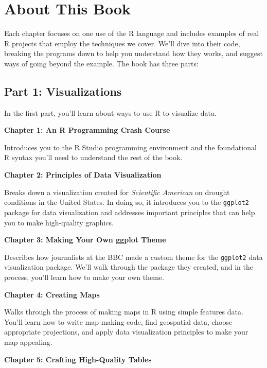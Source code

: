 \documentclass[
]{book}
\begin{document}
\hypertarget{about-this-book}{%
\section*{About This Book}\label{about-this-book}}

Each chapter focuses on one use of the R language and includes examples of real R projects that employ the techniques we cover. We'll dive into their code, breaking the programs down to help you understand how they works, and suggest ways of going beyond the example. The book has three parts:

\hypertarget{part-1-visualizations}{%
\subsection*{Part 1: Visualizations}\label{part-1-visualizations}}

In the first part, you'll learn about ways to use R to visualize data.

\textbf{Chapter 1: An R Programming Crash Course}

Introduces you to the R Studio programming environment and the foundational R syntax you'll need to understand the rest of the book.

\textbf{Chapter 2: Principles of Data Visualization}

Breaks down a visualization created for \emph{Scientific American} on drought conditions in the United States. In doing so, it introduces you to the \texttt{ggplot2} package for data visualization and addresses important principles that can help you to make high-quality graphics.

\textbf{Chapter 3: Making Your Own ggplot Theme}

Describes how journalists at the BBC made a custom theme for the \texttt{ggplot2} data visualization package. We'll walk through the package they created, and in the process, you'll learn how to make your own theme.

\textbf{Chapter 4: Creating Maps}

Walks through the process of making maps in R using simple features data. You'll learn how to write map-making code, find geospatial data, choose appropriate projections, and apply data visualization principles to make your map appealing.

\textbf{Chapter 5: Crafting High-Quality Tables}
\end{document}
